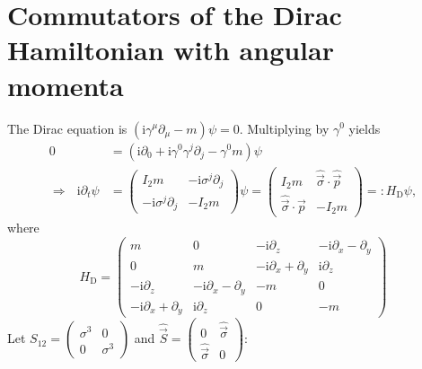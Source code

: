 \documentclass[english, parskip=full]{scrartcl}
\newcommand{\tecxt}{}
\def\I{\text{i}}
\begin{document}
\section{Commutators of the Dirac Hamiltonian with angular momenta}
The Dirac equation is $(\I\gamma^\mu\partial_\mu-m)\psi=0$. Multiplying by $\gamma^0$ yields
\begin{align*}
0&=(\I\partial_0+\I\gamma^0\gamma^j\partial_j-\gamma^0m)\psi\\
\Rightarrow\ \ \ \I\partial_t\psi&=\begin{pmatrix}
I_2m&-\I\sigma^j\partial_j \\ -\I\sigma^j\partial_j & -I_2m
\end{pmatrix}\psi=\begin{pmatrix}
I_2m&\hat{\vec{\sigma}}\cdot\hat{\vec{p}} \\ \hat{\vec{\sigma}}\cdot\hat{\vec{p}} & -I_2m
\end{pmatrix} =:H_\tecxt\text{D}\psi,
\end{align*}
where
$$H_\tecxt\text{D}=\begin{pmatrix}
m&0&-\I\partial_z&-\I\partial_x-\partial_y\\
0&m&-\I\partial_x+\partial_y&\I\partial_z\\
-\I\partial_z&-\I\partial_x-\partial_y&-m&0\\
-\I\partial_x+\partial_y&\I\partial_z&0&-m
\end{pmatrix}$$
Let $S_{12}=\begin{pmatrix}
\sigma^3&0\\ 0&\sigma^3
\end{pmatrix} $ and $\hat{\vec{S}}=\begin{pmatrix}
0&\hat{\vec{\sigma}} \\ \hat{\vec{\sigma}} & 0
\end{pmatrix} $:
\end{document}
